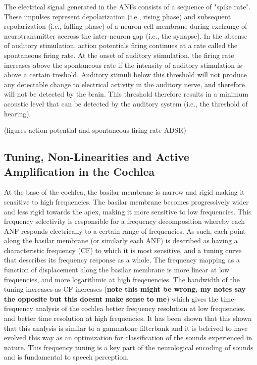 The electrical signal generated in the ANFs consists of a sequence of "spike rate". These impulses represent depolarization (i.e., rising phase) and subsequent repolarization (i.e., falling phase) of a neuron cell membrane during exchange of neurotransmitter accross the inter-neuron gap (i.e., the synapse). In the absense of auditory stimulation, action potentials firing continues at a rate called the spontaneous firing rate. At the onset of auditory stimulation, the firing rate increases above the spontaneous rate if the intensity of auditory stimulation is above a certain treshold. Auditory stimuli below this threshold will not produce any detectable change to electrical activity in the auditory nerve, and therefore will not be detected by the brain. This threshold therefore results in a minimum acoustic level that can be detected by the auditory system (i.e., the threshold of hearing).

(figures action potential and spontaneous firing rate ADSR)
 

\subsection{Tuning, Non-Linearities and Active Amplification in the Cochlea}

At the base of the cochlea, the basilar membrane is narrow and rigid making it sensitive to high frequencies. The basilar membrane becomes progressively wider and less rigid towards the apex, making it more sensitive to low frequencies. This frequency selectivity is responsible for a frequency decomposition whereby each ANF responds electrically to a certain range of frequencies. As such, each point along the basilar membrane (or similarly each ANF) is described as having a characteristic frequency (CF) to which it is most sensitive, and a tuning curve that describes its frequency response as a whole. The frequency mapping as a function of displacement along the basilar membrane is more linear at low frequencies, and more logarithmic at high freqeuencies. The bandwidth of the tuning increases as CF increases (\textbf{note this might be wrong, my notes say the opposite but this doesnt make sense to me}) which gives the time-frequency analysis of the cochlea better frequency resolution at low frequencies, and better time resolution at high frequencies. It has been shown that this shown that this analysis is similar to a gammatone filterbank \citep{lewicki2002coding} and it is beleived to have evolved this way as an optimization for classification of the sounds experienced in nature. This frequency tuning is a key part of the neurological encoding of sounds and is fundamental to speech perception.

